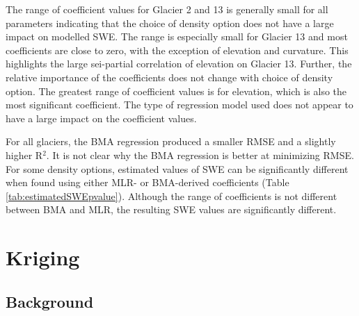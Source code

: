 \documentclass{sfuthesis}
\begin{document}
The range of coefficient values for Glacier 2 and 13 is generally small for all parameters indicating that the choice of density option does not have a large impact on modelled SWE. The range is especially small for Glacier 13 and most coefficients are close to zero, with the exception of elevation and curvature. This highlights the large sei-partial correlation of elevation on Glacier 13. Further, the relative importance of the coefficients does not change with choice of density option. The greatest range of coefficient values is for elevation, which is also the most significant coefficient. The type of regression model used does not appear to have a large impact on the coefficient values.

For all glaciers, the BMA regression produced a smaller RMSE and a slightly higher R$^2$. It is not clear why the BMA regression is better at minimizing RMSE. For some density options, estimated values of SWE can be significantly different when found using either MLR- or BMA-derived coefficients (Table \ref{tab:estimatedSWEpvalue}). Although the range of coefficients is not different between BMA and MLR, the resulting SWE values are significantly different. 

\section{Kriging}
\label{sec:kriging}

\subsection{Background}
\end{document}
